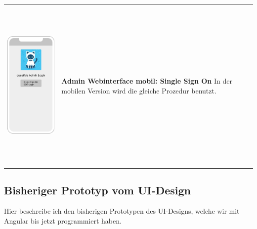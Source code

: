 \begin{tabular}{C{6cm}  L{7cm}}
    \includegraphics[width=5cm,height=8.5cm]{bilder/new vers. UI Design/Login SSO/Interface SSO v1.2.png}               & \textbf{Admin Webinterface mobil: Single Sign On} \newline
    In der mobilen Version wird die gleiche Prozedur benutzt.
\end{tabular}

\newpage

\subsection{Bisheriger Prototyp vom UI-Design}
Hier beschreibe ich den bisherigen Prototypen des UI-Designs, 
welche wir mit Angular bis jetzt programmiert haben.
\\

